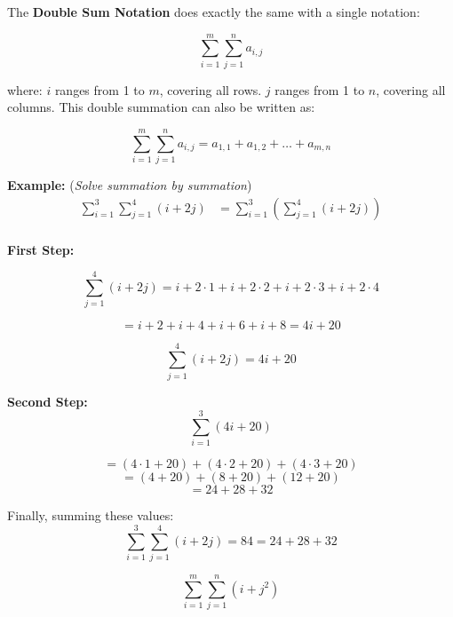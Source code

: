 \documentclass{article}
\begin{document}
The \textbf{Double Sum Notation} does exactly the same with a single notation: 

\[
\sum_{i=1}^m \sum_{j=1}^n a_{i,j}
\]

where:
\(i\) ranges from 1 to \(m\), covering all rows.
\(j\) ranges from 1 to \(n\), covering all columns. This double summation can also be written as:

\[
\sum_{i=1}^m \sum_{j=1}^n a_{i,j} = a_{1,1} + a_{1,2} + \dots + a_{m,n}
\]

\textbf{Example: }(\textit{Solve summation by summation})
\begin{align*}
\sum_{i=1}^{3} \sum_{j=1}^{4} (i + 2j) &= \sum_{i=1}^{3} \left( \sum_{j=1}^{4} (i + 2j) \right) \\
\end{align*}

\textbf{First Step:}

\[
\sum_{j=1}^{4} (i + 2j) = i + 2 \cdot 1 + i + 2 \cdot 2 + i + 2 \cdot 3 + i + 2 \cdot 4
\]

\[
= i + 2 + i + 4 + i + 6 + i + 8 = 4i + 20
\]

\[
\sum_{j=1}^{4} (i + 2j) = 4i + 20
\]

\textbf{Second Step:}
\[
\sum_{i=1}^{3} (4i + 20)
\]

\[
= (4 \cdot 1 + 20) + (4 \cdot 2 + 20) + (4 \cdot 3 + 20)
\]
\[
= (4 + 20) + (8 + 20) + (12 + 20)
\]
\[
= 24 + 28 + 32
\]

Finally, summing these values:
\[
\sum_{i=1}^{3} \sum_{j=1}^{4} (i + 2j) = 84 = 24 + 28 + 32 
\]

\[
\sum_{i=1}^{m} \sum_{j=1}^{n} (i + j^2)
\]
\end{document}
